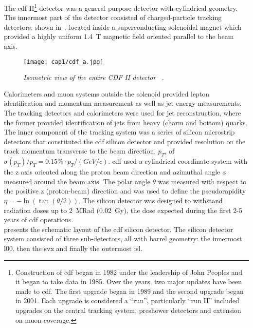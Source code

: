 \hskip 1cm The \gls{cdf} II\footnote{Construction of \gls{cdf} began in 1982
  under the leadership of John Peoples and it began to take data in 1985. Over
  the years, two major updates have been made to \gls{cdf}. The first upgrade
  began in 1989 and the second upgrade began in 2001. Each upgrade is considered
  a ``run'', particularly ``run II'' included upgrades on the central tracking
  system, preshower detectors and extension on muon coverage.} detector was a
general purpose detector with cylindrical geometry. The innermost part of the
detector consisted of charged-particle tracking detectors, shown in~,
located inside a superconducting solenoidal magnet which provided a highly
uniform 1.4~T magnetic field oriented parallel to the beam axis.
\begin{figure}[!htbp]
  \centering\texttt{[image: cap1/cdf\_a.jpg]}
  \caption{\it Isometric view of the entire CDF II detector
    ~\cite{Aaltonen}.}\label{cdf_a}
\end{figure}
Calorimeters and muon systems outside the solenoid provided lepton
identification and momentum measurement as well as jet energy measurements. The
tracking detectors and calorimeters were used for jet reconstruction, where the
former provided identification of jets from heavy (charm and bottom) quarks. The
inner component of the tracking system was a series of silicon microstrip
detectors that constituted the \gls{cdf} silicon detector and provided
resolution on the track momentum transverse to the beam direction, $p_T$, of
$\sigma(p_T )/p_T = 0.15 \% \cdot p_T/(GeV/c)$. \gls{cdf} used a cylindrical
coordinate system with the z axis oriented along the proton beam direction and
azimuthal angle $\phi$ measured around the beam axis. The polar angle $\theta$
was measured with respect to the positive z (proton-beam) direction and was used
to define the pseudorapidity $\eta = -\ln (\tan(\theta /2))$. The silicon
detector was designed to withstand radiation doses up to 2~MRad (0.02~Gy), the
dose expected during the first 2-5 years of \gls{cdf} operations.\\
 presents the schematic layout of the \gls{cdf} silicon detector. The
silicon detector system consisted of three sub-detectors, all with barrel
geometry: the innermost \gls{l00}, then the \gls{svx} and finally the outermost
\gls{isl}.
